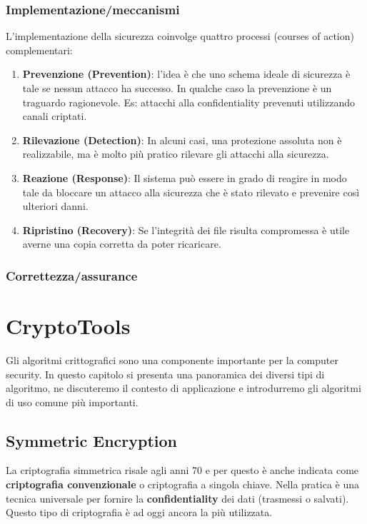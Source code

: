 \documentclass[12pt]{article}
\begin{document}
			\subsubsection{Implementazione/meccanismi}
				L'implementazione della sicurezza coinvolge quattro processi (courses of action) complementari:
				\begin{enumerate}
					\item \textbf{Prevenzione (Prevention)}: l'idea è che uno schema ideale di sicurezza è tale se nessun attacco ha successo. In qualche caso la prevenzione è un traguardo ragionevole. Es: attacchi alla confidentiality prevenuti utilizzando canali criptati.
					\item \textbf{Rilevazione (Detection)}: In alcuni casi, una protezione assoluta non è realizzabile, ma è molto più pratico rilevare gli attacchi alla sicurezza.
					\item \textbf{Reazione (Response)}: Il sistema può essere in grado di reagire in modo tale da bloccare un attacco alla sicurezza che è stato rilevato e prevenire così ulteriori danni.
					\item \textbf{Ripristino (Recovery)}: Se l'integrità dei file risulta compromessa è utile averne una copia corretta da poter ricaricare.
				\end{enumerate}
			\subsubsection{Correttezza/assurance}
\section{CryptoTools}
	Gli algoritmi crittografici sono una componente importante per la computer security. In questo capitolo si presenta una panoramica dei diversi tipi di algoritmo, ne discuteremo il contesto di applicazione e introdurremo gli algoritmi di uso comune più importanti.
	\subsection{Symmetric Encryption}
		La criptografia simmetrica risale agli anni 70 e per questo è anche indicata come \textbf{criptografia convenzionale} o criptografia a singola chiave. Nella pratica è una tecnica universale per fornire la \textbf{confidentiality} dei dati (trasmessi o salvati). Questo tipo di criptografia è ad oggi ancora la più utilizzata.
\end{document}
